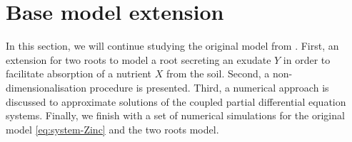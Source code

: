 \documentclass[11pt]{article}
\numberwithin{equation}{section}
\begin{document}
\newpage

\section{Base model extension}
\label{sec:Base}


In this section, we will continue studying the original model from \cite{Ptashnyk-2011}. First, an extension for two roots to model a root secreting an exudate $Y$ in order to facilitate absorption of a nutrient $X$ from the soil. Second, a non-dimensionalisation procedure is presented. Third, a numerical approach is discussed to approximate solutions of the coupled partial differential equation systems. Finally, we finish with a set of numerical simulations for the original model \eqref{eq:system-Zinc} and the two roots model.

\end{document}
